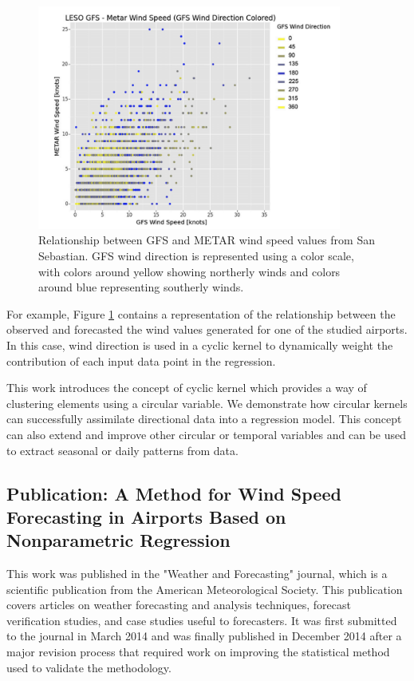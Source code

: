 \begin{figure}[h]
 \centerline{\includegraphics[width=10cm]{paper1.png}}\caption{Relationship between GFS and METAR wind speed values from San Sebastian. GFS wind direction is represented using a color scale, with colors around yellow showing northerly winds and colors around blue representing southerly winds.}\label{paper1}
\end{figure}

For example, Figure \ref{paper1} contains a representation of the relationship between the observed and forecasted the wind values generated for one of the studied airports. In this case, wind direction is used in a cyclic kernel to dynamically weight the contribution of each input data point in the regression.

\medskip

This work introduces the concept of cyclic kernel which provides a way of clustering elements using a circular variable. We demonstrate how circular kernels can  successfully assimilate
directional data into a regression model. This concept can also extend and improve other circular or temporal variables and can be used to extract seasonal or daily patterns from data.

\subsection{Publication: A Method for Wind Speed Forecasting in Airports Based on Nonparametric Regression}

This work was published in the "Weather and Forecasting" journal, which is a scientific publication from the American Meteorological Society. This publication covers articles on weather forecasting and analysis techniques, forecast verification studies, and case studies useful to forecasters. It was first submitted to the journal in March 2014 and was finally published in December 2014 after a major revision process that required work on improving the statistical method used to validate the methodology.

